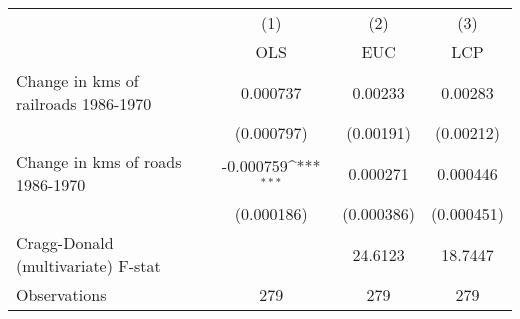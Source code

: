 {
\def\sym#1{\ifmmode^{#1}\else\(^{#1}\)\fi}
\begin{tabular}{l*{3}{c}}
\hline\hline
                &\multicolumn{1}{c}{(1)}&\multicolumn{1}{c}{(2)}&\multicolumn{1}{c}{(3)}\\
                &\multicolumn{1}{c}{OLS}&\multicolumn{1}{c}{EUC}&\multicolumn{1}{c}{LCP}\\
\hline
Change in kms of railroads 1986-1970& 0.000737         &  0.00233         &  0.00283         \\
                &(0.000797)         &(0.00191)         &(0.00212)         \\
[1em]
Change in kms of roads 1986-1970&-0.000759\sym{***}& 0.000271         & 0.000446         \\
                &(0.000186)         &(0.000386)         &(0.000451)         \\
\hline
Cragg-Donald (multivariate) F-stat&                  &  24.6123         &  18.7447         \\
Observations    &      279         &      279         &      279         \\
\hline\hline
\end{tabular}
}
